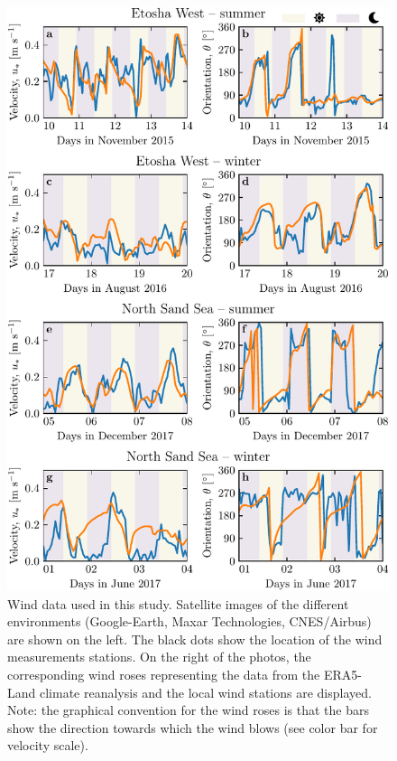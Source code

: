 \begin{figure}[t]
\centering
\includegraphics[scale=1]{Figures/Figure2.pdf}
\caption{Wind data used in this study. Satellite images of the different environments (Google-Earth, Maxar Technologies, CNES/Airbus) are shown on the left. The black dots show the location of the wind measurements stations. On the right of the photos, the corresponding wind roses representing the data from the ERA5-Land climate reanalysis and the local wind stations are displayed. Note: the graphical convention for the wind roses is that the bars show the direction towards which the wind blows (see color bar for velocity scale).}
\label{Fig2}
\end{figure}


